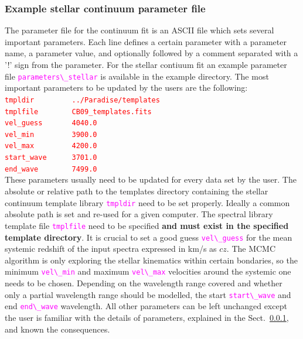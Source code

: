 \documentclass[usenatbib,usegraphicx,useAMS,onecolumn]{mn2e}
\newcommand{\codeline}[1]{\lstinline|#1|}
\newcommand{\fname}[1]{\textcolor{magenta}{\codeline{#1}}}
\begin{document}
\subsubsection{Example stellar continuum parameter file}
The parameter file for the continuum fit is an ASCII file which sets several important parameters. Each line defines a certain parameter with a parameter name,  a parameter value, and optionally followed by a comment separated with a '!' sign from the parameter. For the stellar contiuum fit an example parameter file \fname{parameters\_stellar} is available in the example directory. The most important parameters to be updated by the users are the following:\bigskip\\
\textcolor{red}{\codeline{tmpldir         ../Paradise/templates}}\\
\textcolor{red}{\codeline{tmplfile        CB09_templates.fits}}\\   
\textcolor{red}{\codeline{vel_guess       4040.0}}\\ 
\textcolor{red}{\codeline{vel_min         3900.0}}\\
\textcolor{red}{\codeline{vel_max         4200.0}}\\ 
\textcolor{red}{\codeline{start_wave      3701.0}}\\  
\textcolor{red}{\codeline{end_wave        7499.0}}\bigskip\\  
These parameters usually need to be updated for every data set by the user. The absolute or relative path to the templates directory containing the stellar continuum template library \fname{tmpldir} need to be set properly. Ideally a common absolute path is set and re-used for a given computer. The spectral library template file \fname{tmplfile} need to be specified \textbf{and must exist in the specified template directory}. It is crucial to set a good guess \fname{vel\_guess} for the mean systemic redshift of the input spectra expressed in km/s as $cz$. The MCMC algorithm is only exploring the stellar kinematics within certain bondaries, so the minimum \fname{vel\_min} and maximum \fname{vel\_max} velocities around the systemic one needs to be chosen. Depending on the wavelength range covered and whether only a partial wavelength range should be modelled, the start \fname{start\_wave} and end \fname{end\_wave} wavelength. All other parameters can be left unchanged except the user is familiar with the details of parameters, explained in the Sect.~\ref{}, and known the consequences.
\end{document}

